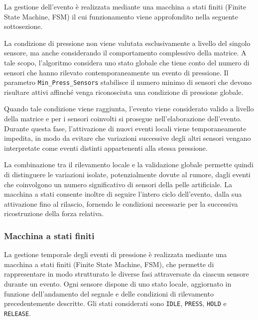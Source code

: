 \documentclass[10pt, a4paper]{article}
\begin{document}
                La gestione dell'evento è realizzata mediante una macchina a stati finiti (Finite State Machine, FSM) il cui funzionamento viene approfondito nella seguente sottosezione.

                La condizione di pressione non viene valutata esclusivamente a livello del singolo sensore, ma anche considerando il comportamento complessivo della matrice. A tale scopo, 
                l'algoritmo considera uno stato globale che tiene conto del numero di sensori che hanno rilevato contemporaneamente un evento di pressione. Il parametro \texttt{Min\_Press\_Sensors} 
                stabilisce il numero minimo di sensori che devono risultare attivi affinché venga riconosciuta una condizione di pressione globale.

                Quando tale condizione viene raggiunta, l'evento viene considerato valido a livello della matrice e per i sensori coinvolti si prosegue nell'elaborazione dell'evento. 
                Durante questa fase, l'attivazione di nuovi eventi locali viene temporaneamente impedita, in modo da evitare che variazioni successive degli altri sensori vengano interpretate 
                come eventi distinti appartenenti alla stessa pressione.

                La combinazione tra il rilevamento locale e la validazione globale permette quindi di distinguere le variazioni isolate, potenzialmente dovute al rumore, dagli eventi che 
                coinvolgono un numero significativo di sensori della pelle artificiale. La macchina a stati consente inoltre di seguire l'intero ciclo dell'evento, dalla sua attivazione fino al rilascio, 
                fornendo le condizioni necessarie per la successiva ricostruzione della forza relativa.

            \subsubsection{Macchina a stati finiti}
                La gestione temporale degli eventi di pressione è realizzata mediante una macchina a stati finiti (Finite State Machine, FSM), che permette di rappresentare in modo strutturato 
                le diverse fasi attraversate da ciascun sensore durante un evento. Ogni sensore dispone di uno stato locale, aggiornato in funzione dell'andamento del segnale e delle condizioni di 
                rilevamento precedentemente descritte. Gli stati considerati sono \texttt{IDLE}, \texttt{PRESS}, \texttt{HOLD} e \texttt{RELEASE}.
                    
\end{document}
